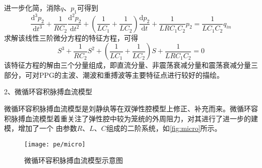 进一步化简，消除$q$、$p_{1}$可得到
\begin{equation}
    \label{equ:diff}
    \frac{\mathrm{d^3} p_{2}}{\mathrm{d} t^3}+\frac{1}{RC_{2}}\frac{\mathrm{d}^2p_{2} }{\mathrm{d} t^2}+
    (\frac{1}{LC_{1}}+\frac{1}{LC_{2}})\frac{\mathrm{d} p_{2}}{\mathrm{d} t}+\frac{1}{LRC_{1}C_{2}}p_{2}
    =\frac{1}{LC_{1}C_{2}}q_{in}
\end{equation}
求解该线性三阶微分方程的特征方程，可得
\begin{equation}
    \label{equ:character}
    S^3+\frac{1}{RC_{2}}S^2+(\frac{1}{LC_{1}}+\frac{1}{LC_{2}})S+\frac{1}{LRC_{1}C_{2}}=0
\end{equation}
该特征方程的解由三个分量组成，即直流分量、非震荡衰减分量和震荡衰减分量三部分，可对PPG的主波、潮波和重搏波等主要特征点进行较好的描绘。

2、微循环容积脉搏血流模型

微循环容积脉搏血流模型是刘静纨等\cite{Liu2001}在双弹性腔模型上修正、补充而来。微循环容积脉搏血流模型着重关注了弹性腔中较为笼统的外周阻力，对其进行了进一步的建模，增加了一个
由参数$R$、$L$、$C$组成的二阶系统，如\autoref{fig:micro}所示。
\begin{figure}[htbp]
    \centering
    \texttt{[image: pe/micro]}
    \caption[微循环容积脉搏血流模型示意图]{\label{fig:micro}微循环容积脉搏血流模型示意图\cite{PPGYY}}
\end{figure}

